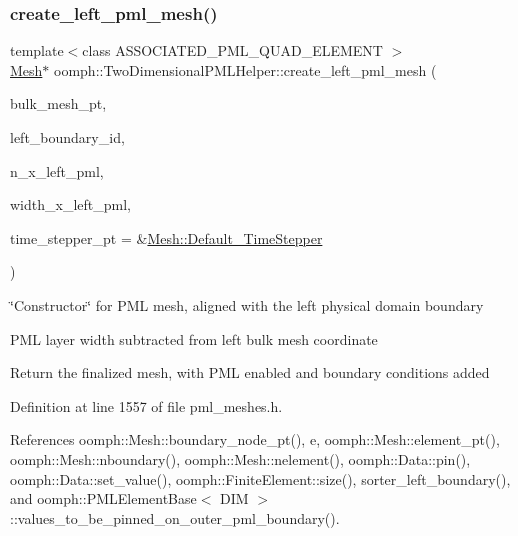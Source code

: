 \mbox{\label{namespaceoomph_1_1TwoDimensionalPMLHelper_acc70ea22db897a5e20676d8136759308}} 
\subsubsection{\texorpdfstring{create\+\_\+left\+\_\+pml\+\_\+mesh()}{create\_left\_pml\_mesh()}}
{\footnotesize\ttfamily template$<$class A\+S\+S\+O\+C\+I\+A\+T\+E\+D\+\_\+\+P\+M\+L\+\_\+\+Q\+U\+A\+D\+\_\+\+E\+L\+E\+M\+E\+NT $>$ \\
\hyperlink{classoomph_1_1Mesh}{Mesh}$\ast$ oomph\+::\+Two\+Dimensional\+P\+M\+L\+Helper\+::create\+\_\+left\+\_\+pml\+\_\+mesh (\begin{DoxyParamCaption}\item[{\hyperlink{classoomph_1_1Mesh}{Mesh} $\ast$}]{bulk\+\_\+mesh\+\_\+pt,  }\item[{const unsigned \&}]{left\+\_\+boundary\+\_\+id,  }\item[{const unsigned \&}]{n\+\_\+x\+\_\+left\+\_\+pml,  }\item[{const double \&}]{width\+\_\+x\+\_\+left\+\_\+pml,  }\item[{\hyperlink{classoomph_1_1TimeStepper}{Time\+Stepper} $\ast$}]{time\+\_\+stepper\+\_\+pt = {\ttfamily \&\hyperlink{classoomph_1_1Mesh_a12243d0fee2b1fcee729ee5a4777ea10}{Mesh\+::\+Default\+\_\+\+Time\+Stepper}} }\end{DoxyParamCaption})}



\char`\"{}\+Constructor\char`\"{} for P\+ML mesh, aligned with the left physical domain boundary 

P\+ML layer width subtracted from left bulk mesh coordinate

Return the finalized mesh, with P\+ML enabled and boundary conditions added 

Definition at line 1557 of file pml\+\_\+meshes.\+h.



References oomph\+::\+Mesh\+::boundary\+\_\+node\+\_\+pt(), e, oomph\+::\+Mesh\+::element\+\_\+pt(), oomph\+::\+Mesh\+::nboundary(), oomph\+::\+Mesh\+::nelement(), oomph\+::\+Data\+::pin(), oomph\+::\+Data\+::set\+\_\+value(), oomph\+::\+Finite\+Element\+::size(), sorter\+\_\+left\+\_\+boundary(), and oomph\+::\+P\+M\+L\+Element\+Base$<$ D\+I\+M $>$\+::values\+\_\+to\+\_\+be\+\_\+pinned\+\_\+on\+\_\+outer\+\_\+pml\+\_\+boundary().

